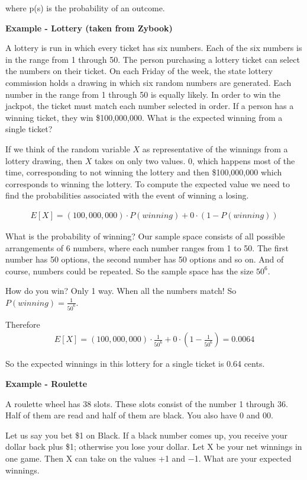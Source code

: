 \documentclass[12pt]{article}
\begin{document}
where p(s) is the probability of an outcome.

\textbf{Example - Lottery (taken from Zybook)}

A lottery is run in which every ticket has six numbers. Each of the six numbers is in the range from 1 through 50. The person purchasing a lottery ticket can select the numbers on their ticket. On each Friday of the week, the state lottery commission holds a drawing in which six random numbers are generated. Each number in the range from 1 through 50 is equally likely. In order to win the jackpot, the ticket must match each number selected in order. If a person has a winning ticket, they win \$100,000,000. What is the expected winning from a single ticket?

If we think of the random variable $X$ as representative of the winnings from a lottery drawing, then $X$ takes on only two values. 0, which happens most of the time, corresponding to not winning the lottery and then \$100,000,000 which corresponds to winning the lottery. To compute the expected value we need to find the probabilities associated with the event of winning a losing.

\begin{align*}
E[X] = (100,000,000) \cdot P(winning) + 0 \cdot (1 - P(winning))
\end{align*}

What is the probability of winning? Our sample space consists of all possible arrangements of 6 numbers, where each number ranges from 1 to 50. The first number has 50 options, the second number has 50 options and so on. And of course, numbers could be repeated. So the sample space has the size $50^6$. 

How do you win? Only 1 way. When all the numbers match! So $P(winning) = \frac{1}{50^6}$.

Therefore 
\begin{align*}
E[X] = (100,000,000) \cdot \frac{1}{50^6} + 0 \cdot (1 - \frac{1}{50^6}) = 0.0064
\end{align*}

So the expected winnings in this lottery for a single ticket is 0.64 cents.

\medskip

\textbf{Example - Roulette}

A roulette wheel has 38 slots. These slots consist of the number 1 through 36. Half of them are read and half of them are black. You also have 0 and 00.  

Let us say you bet \$1 on Black. If a black number comes up, you receive
your dollar back plus \$1; otherwise you lose your dollar. Let X be your net winnings in one game. Then X can take on the values +1 and −1. What are your expected winnings.
\end{document}
